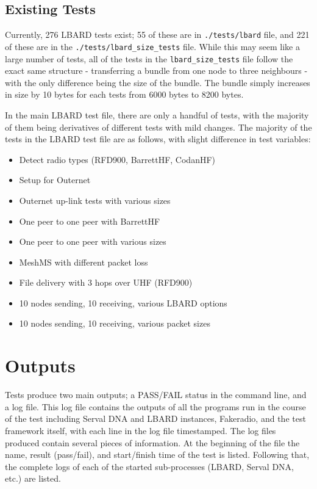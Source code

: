 \subsection{Existing Tests}
Currently, 276 LBARD tests exist; 55 of these are in \texttt{./tests/lbard} file, and 221 of these are in the \texttt{./tests/lbard\_size\_tests} file.
While this may seem like a large number of tests, all of the tests in the \texttt{lbard\_size\_tests} file follow the exact same structure - transferring a bundle from one node to three neighbours - with the only difference being the size of the bundle.
The bundle simply increases in size by 10 bytes for each tests from 6000 bytes to 8200 bytes.

In the main LBARD test file, there are only a handful of tests, with the majority of them being derivatives of different tests with mild changes. 
The majority of the tests in the LBARD test file are as follows, with slight difference in test variables:
\begin{itemize}
    \item Detect radio types (RFD900, BarrettHF, CodanHF)
    \item Setup for Outernet
    \item Outernet up-link tests with various sizes
    \item One peer to one peer with BarrettHF
    \item One peer to one peer with various sizes
    \item MeshMS with different packet loss
    \item File delivery with 3 hops over UHF (RFD900)
    \item 10 nodes sending, 10 receiving, various LBARD options
    \item 10 nodes sending, 10 receiving, various packet sizes
\end{itemize}




\section{Outputs}
Tests produce two main outputs; a PASS/FAIL status in the command line, and a log file.
This log file contains the outputs of all the programs run in the course of the test including Serval DNA and LBARD instances, Fakeradio, and the test framework itself, with each line in the log file timestamped.
The log files produced contain several pieces of information.
At the beginning of the file the name, result (pass/fail), and start/finish time of the test is listed.
Following that, the complete logs of each of the started sub-processes (LBARD, Serval DNA, etc.) are listed.

